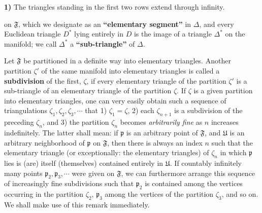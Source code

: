 \documentclass{article}
\begin{document}
\textbf{1)} The triangles standing in the first two rows extend through infinity.

on $\mathfrak{F}$, which we designate as an \textbf{``elementary segment''} in $\Delta$, and every Euclidean triangle $D^*$ lying entirely in $D$ is the image of a triangle $\Delta^*$ on the manifold; we call $\Delta^*$ a \textbf{``sub-triangle''} of $\Delta$.

Let $\mathfrak{F}$ be partitioned in a definite way into elementary triangles. Another partition $\zeta'$ of the same manifold into elementary triangles is called a \textbf{subdivision} of the first, $\zeta$, if every elementary triangle of the partition $\zeta'$ is a sub-triangle of an elementary triangle of the partition $\zeta$. If $\zeta$ is a given partition into elementary triangles, one can very easily obtain such a sequence of triangulations $\zeta_1, \zeta_2, \zeta_3, \cdots$ that 1) $\zeta_1 = \zeta$, 2) each $\zeta_{n+1}$ is a subdivision of the preceding $\zeta_n$, and 3) the partition $\zeta_n$ becomes \emph{arbitrarily fine} as $n$ increases indefinitely. The latter shall mean: if $\mathfrak{p}$ is an arbitrary point of $\mathfrak{F}$, and $\mathfrak{U}$ is an arbitrary neighborhood of $\mathfrak{p}$ on $\mathfrak{F}$, then there is always an index $n$ such that the elementary triangle (or exceptionally: the elementary triangles) of $\zeta_n$ in which $\mathfrak{p}$ lies is (are) itself (themselves) contained entirely in $\mathfrak{U}$. If countably infinitely many points $\mathfrak{p}_2, \mathfrak{p}_3, \cdots$ were given on $\mathfrak{F}$, we can furthermore arrange this sequence of increasingly fine subdivisions such that $\mathfrak{p}_2$ is contained among the vertices occurring in the partition $\zeta_2$, $\mathfrak{p}_3$ among the vertices of the partition $\zeta_3$, and so on. We shall make use of this remark immediately.
\end{document}
